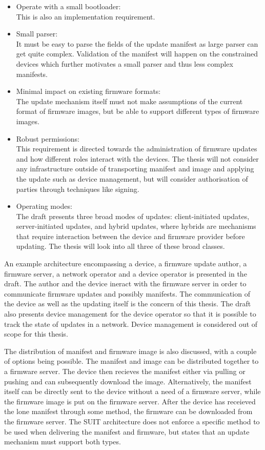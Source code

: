 \documentclass[0-thesis.tex]{subfiles}
\begin{document}
\begin{itemize}
    \item Operate with a small bootloader:\\
            This is also an implementation requirement. %
    \item Small parser:\\
            It must be easy to parse the fields of the update manifest as large parser can
            get quite complex. Validation of the manifest will happen on the constrained
            devices which further motivates a small parser and thus less complex
            manifests.
    \item Minimal impact on existing firmware formats:\\
            The update mechanism itself must not make assumptions of the current format of
            firmware images, but be able to support different types of firmware images.
    \item Robust permissions:\\
            This requirement is directed towards the administration of firmware updates
            and how different roles interact with the devices. The thesis will not
            consider any infrastructure outside of transporting manifest and image and
            applying the update such as device management, but will consider authorisation
            of parties through techniques like signing.
    \item Operating modes:\\
            The draft presents three broad modes of updates: client-initiated updates,
            server-initiated updates, and hybrid updates, where hybrids are mechanisms
            that require interaction between the device and firmware provider before
            updating. The thesis will look into all three of these broad classes.
\end{itemize}

An example architecture encompassing a device, a firmware update author, a firmware
server, a network operator and a device operator is presented in the draft. The author and
the device ineract with the firmware server in order to communicate firmware updates and
possibly manifests. The communication of the device as well as the updating itself is the
concern of this thesis. The draft also presents device management for the device operator
so that it is possible to track the state of updates in a network. Device management is
considered out of scope for this thesis.

The distribution of manifest and firmware image is also discussed, with a couple of
options being possible. The manifest and image can be distributed together to a firmware
server. The device then recieves the manifest either via pulling or pushing and can
subsequently download the image. Alternatively, the manifest itself can be directly sent
to the device without a need of a firmware server, while the firmware image is put on the
firmware server. After the device has receieved the lone manifest through some method, the
firmware can be downloaded from the firmware server. The SUIT architecture does not
enforce a specific method to be used when delivering the manifest and firmware, but states
that an update mechanism must support both types.
\end{document}
